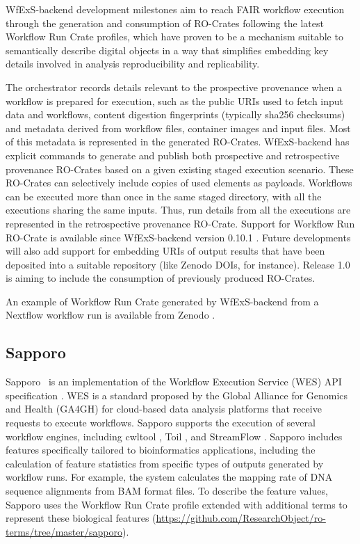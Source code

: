 \documentclass[10pt,letterpaper]{article}
\begin{document}
WfExS-backend development milestones aim to reach FAIR workflow execution through the generation and consumption of RO-Crates following the latest Workflow Run Crate profiles, which have proven to be a mechanism suitable to semantically describe digital objects in a way that simplifies embedding key details involved in analysis reproducibility and replicability.

The orchestrator records details relevant to the prospective provenance when a workflow is prepared for execution, such as the public URIs used to fetch input data and workflows, content digestion fingerprints (typically sha256 checksums) and metadata derived from workflow files, container images and input files.
Most of this metadata is represented in the generated RO-Crates. WfExS-backend has explicit commands to generate and publish both prospective and retrospective provenance RO-Crates based on a given existing staged execution scenario.
These RO-Crates can selectively include copies of used elements as payloads.
Workflows can be executed more than once in the same staged directory, with all the executions sharing the same inputs.
Thus, run details from all the executions are represented in the retrospective provenance RO-Crate. Support for Workflow Run RO-Crate is available since WfExS-backend version 0.10.1 \cite{Fernández 2023a}.
Future developments will also add support for embedding URIs of output results that have been deposited into a suitable repository (like Zenodo DOIs, for instance).
Release 1.0 is aiming to include the consumption of previously produced RO-Crates.

An example of Workflow Run Crate generated by WfExS-backend from a Nextflow workflow run \cite{Bouyssié 2023} is available from Zenodo \cite{Fernández 2023b}.


\subsection{Sapporo}\label{sapporo}

Sapporo~\cite{Suetake 2022a} is an implementation of the Workflow Execution Service (WES) API specification \cite{Magee 2018}.
WES is a standard proposed by the Global Alliance for Genomics and Health (GA4GH) for cloud-based data analysis platforms that receive requests to execute workflows.
Sapporo supports the execution of several workflow engines, including cwltool \cite{Amstutz 2023}, Toil \cite{Vivian 2017}, and StreamFlow \cite{Colonnelli 2020}.
Sapporo includes features specifically tailored to bioinformatics applications, including the calculation of feature statistics from specific types of outputs generated by workflow runs.
For example, the system calculates the mapping rate of DNA sequence alignments from BAM format files.
To describe the feature values, Sapporo uses the Workflow Run Crate profile extended with additional terms to represent these biological features (\url{https://github.com/ResearchObject/ro-terms/tree/master/sapporo}).
\end{document}
